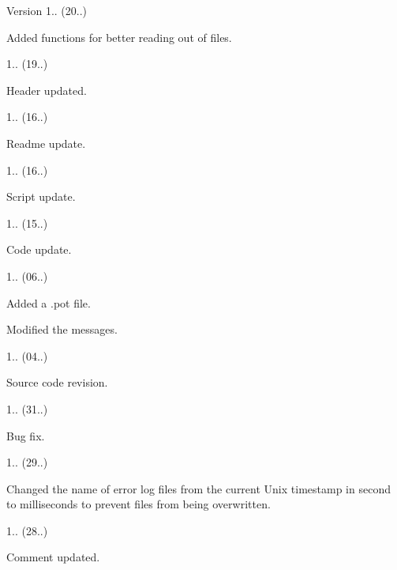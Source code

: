 \begin{DoxyVersion}{Version}
1.. (20..)
\begin{DoxyItemize}
\item Added functions for better reading out of files. 
\end{DoxyItemize}

1.. (19..)
\begin{DoxyItemize}
\item Header updated. 
\end{DoxyItemize}

1.. (16..)
\begin{DoxyItemize}
\item Readme update. 
\end{DoxyItemize}

1.. (16..)
\begin{DoxyItemize}
\item Script update. 
\end{DoxyItemize}

1.. (15..)
\begin{DoxyItemize}
\item Code update. 
\end{DoxyItemize}

1.. (06..)
\begin{DoxyItemize}
\item Added a .pot file.
\item Modified the messages. 
\end{DoxyItemize}

1.. (04..)
\begin{DoxyItemize}
\item Source code revision. 
\end{DoxyItemize}

1.. (31..)
\begin{DoxyItemize}
\item Bug fix. 
\end{DoxyItemize}

1.. (29..)
\begin{DoxyItemize}
\item Changed the name of error log files from the current Unix timestamp in second to milliseconds to prevent files from being overwritten. 
\end{DoxyItemize}

1.. (28..)
\begin{DoxyItemize}
\item Comment updated. 
\end{DoxyItemize}


\end{DoxyVersion}
